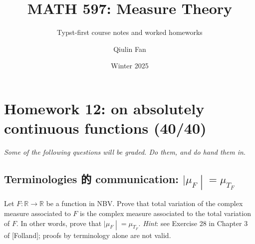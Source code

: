 \documentclass{qlnotes-export}
\title{MATH 597: Measure Theory}
\subtitle{Typst-first course notes and worked homeworks}
\author{Qiulin Fan}
\date{Winter 2025}
\begin{document}
\mainmatter
\chapter{Homework 12: on absolutely continuous functions (40/40)}\label{homework-12-on-absolutely-continuous-functions-4040}

\emph{Some of the following questions will be graded. Do them, and do hand them in}.

\section{\texorpdfstring{Terminologies 的 communication: \(\left. |\mu_{F} \middle| = \mu_{T_{F}} \right.\)}{Terminologies 的 communication: \textbackslash left. \textbar\textbackslash mu\_\{F\} \textbackslash middle\textbar{} = \textbackslash mu\_\{T\_\{F\}\} \textbackslash right.}}\label{terminologies-ux7684-communication-mu_fmu_t_f}

Let \(F:{\mathbb{R}}\rightarrow{\mathbb{R}}\) be a function in NBV. Prove that total variation of the complex measure associated to \(F\) is the complex measure associated to the total variation of \(F\). In other words, prove that \(\left. |\mu_{F} \middle| = \mu_{T_{F}} \right.\). \emph{Hint}: see Exercise 28 in Chapter 3 of {[}Folland{]}; proofs by terminology alone are not valid.
\end{document}
